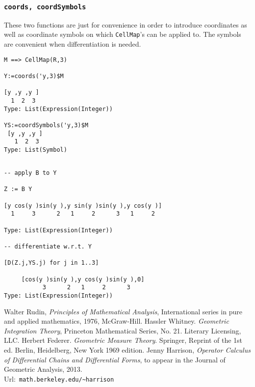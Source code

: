 \documentclass[12pt,a4paper]{article}
\begin{document}
\subsubsection{{\tt coords, coordSymbols}}
These two functions are just for convenience in order to introduce
coordinates as well as coordinate symbols on which {\tt CellMap}'s 
can be applied to. The symbols are convenient when differentiation
is needed.
\begin{lstlisting}
M ==> CellMap(R,3) 

Y:=coords('y,3)$M

[y ,y ,y ]
  1  2  3
Type: List(Expression(Integer))

YS:=coordSymbols('y,3)$M
 [y ,y ,y ]
   1  2  3
Type: List(Symbol)
\end{lstlisting}
\scriptsize
\begin{verbatim}

-- apply B to Y

Z := B Y

[y cos(y )sin(y ),y sin(y )sin(y ),y cos(y )]
  1     3      2   1     2      3   1     2

Type: List(Expression(Integer))

-- differentiate w.r.t. Y

[D(Z.j,YS.j) for j in 1..3]

     [cos(y )sin(y ),y cos(y )sin(y ),0]
           3      2   1     2      3     
Type: List(Expression(Integer))
\end{verbatim}
\normalsize

% 
\begin{thebibliography}{1}
%
 Walter Rudin,
  {\em Principles of Mathematical Analysis},
  International series in pure and applied mathematics,
  1976, McGraw-Hill.
 Hassler Whitney. {\em Geometric Integration Theory},
  Princeton Mathematical Series, No. 21. Literary Licensing, LLC.
 Herbert Federer. {\em Geometric Measure Theory}. Springer,        
  Reprint of the 1st ed. Berlin, Heidelberg, New York 1969 edition.
 Jenny Harrison, {\em Operator Calculus of Differential
  Chains and Differential Forms}, to appear in the Journal of Geometric
  Analysis, 2013. \\
  Url:\ {\small {\tt math.berkeley.edu/\textasciitilde harrison}}
\end{thebibliography}
%
\end{document}
